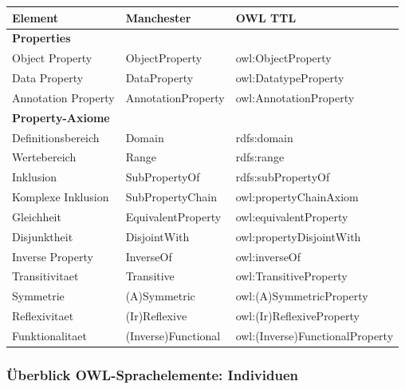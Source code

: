 \documentclass[a4paper]{article}
\begin{document}
\begin{center}
    \begin{tabular}{|l|l|l|}
        \hline
        \textbf{Element} & \textbf{Manchester} & \textbf{OWL TTL} \\
        \hline
        \multicolumn{3}{|l|}{\textbf{Properties}} \\
        \hline
        Object Property & ObjectProperty & owl:ObjectProperty \\
        Data Property & DataProperty & owl:DatatypeProperty \\
        Annotation Property & AnnotationProperty & owl:AnnotationProperty \\
        \hline
        \multicolumn{3}{|l|}{\textbf{Property-Axiome}} \\
        \hline
        Definitionsbereich & Domain & rdfs:domain \\
        Wertebereich & Range & rdfs:range \\
        Inklusion & SubPropertyOf & rdfs:subPropertyOf \\
        Komplexe Inklusion & SubPropertyChain & owl:propertyChainAxiom \\
        Gleichheit & EquivalentProperty & owl:equivalentProperty \\
        Disjunktheit & DisjointWith & owl:propertyDisjointWith \\
        Inverse Property & InverseOf & owl:inverseOf \\
        Transitivitaet & Transitive & owl:TransitiveProperty \\
        Symmetrie & (A)Symmetric & owl:(A)SymmetricProperty \\
        Reflexivitaet & (Ir)Reflexive & owl:(Ir)ReflexiveProperty \\
        Funktionalitaet & (Inverse)Functional & owl:(Inverse)FunctionalProperty \\
        \hline
    \end{tabular}
\end{center}

\subsubsection*{Überblick OWL-Sprachelemente: Individuen}
\end{document}

